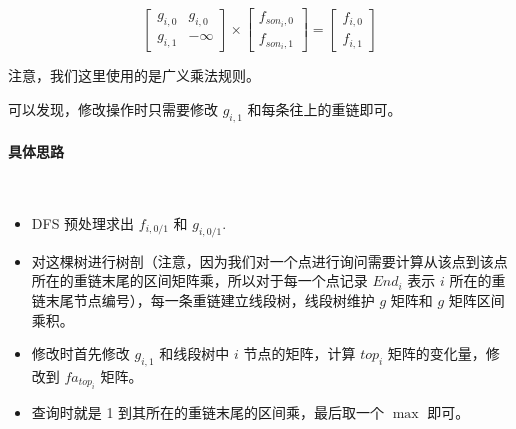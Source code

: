 $$
\begin{bmatrix}
g_{i,0} & g_{i,0}\\
g_{i,1} & -\infty
\end{bmatrix}\times 
\begin{bmatrix}
f_{son_i,0}\\f_{son_i,1}
\end{bmatrix}=
\begin{bmatrix}
f_{i,0}\\f_{i,1}
\end{bmatrix}
$$

注意，我们这里使用的是广义乘法规则。\par

可以发现，修改操作时只需要修改 $g_{i,1}$ 和每条往上的重链即可。\par

\paragraph{具体思路}~{}
\par
\begin{itemize}
    \item DFS 预处理求出 $f_{i,0/1}$ 和 $g_{i,0/1}$.
    \item 对这棵树进行树剖（注意，因为我们对一个点进行询问需要计算从该点到该点所在的重链末尾的区间矩阵乘，所以对于每一个点记录 $End_i$ 表示 $i$ 所在的重链末尾节点编号），每一条重链建立线段树，线段树维护 $g$ 矩阵和 $g$ 矩阵区间乘积。
    \item 修改时首先修改 $g_{i,1}$ 和线段树中 $i$ 节点的矩阵，计算 $top_i$ 矩阵的变化量，修改到 $fa_{top_i}$ 矩阵。
    \item 查询时就是 1 到其所在的重链末尾的区间乘，最后取一个 $\max$ 即可。
\end{itemize}